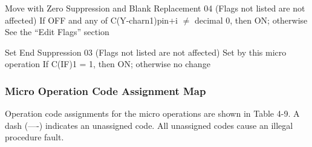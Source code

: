  {Move with Zero Suppression and Blank Replacement} {04}
 {(Flags not listed are not affected)}
 { If OFF and any of C(Y-charn1)pin+i $\neq$ decimal 0, then ON; otherwise}
 {See the {``}Edit Flags'' section}


 {Set End Suppression} {03}
 {(Flags not listed are not affected)}
 {Set by this micro operation}
 {If C(IF)1 = 1, then ON; otherwise no change}

\subsubsection{Micro Operation Code Assignment Map}

Operation code assignments for the micro operations are shown in Table 4-9. A dash (----)
indicates an unassigned code. All unassigned codes cause an illegal procedure fault.

